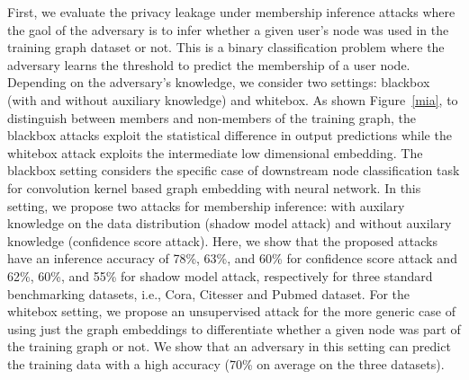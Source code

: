 First, we evaluate the privacy leakage under membership inference attacks where the gaol of the adversary is to infer whether a given user's node was used in the training graph dataset or not.
This is a binary classification problem where the adversary learns the threshold to predict the membership of a user node.
Depending on the adversary's knowledge, we consider two settings: blackbox (with and without auxiliary knowledge) and whitebox.
As shown Figure~\ref{mia}, to distinguish between members and non-members of the training graph, the blackbox attacks exploit the statistical difference in output predictions while the whitebox attack exploits the intermediate low dimensional embedding.
The blackbox setting considers the specific case of downstream node classification task for convolution kernel based graph embedding with neural network. %
In this setting, we propose two attacks for membership inference: with auxilary knowledge on the data distribution (shadow model attack) and without auxilary knowledge (confidence score attack).
Here, we show that the proposed attacks have an inference accuracy of 78\%, 63\%, and 60\% for confidence score attack and 62\%, 60\%, and 55\% for shadow model attack, respectively for three standard benchmarking datasets, i.e., Cora, Citesser and Pubmed dataset.
For the whitebox setting, we propose an unsupervised attack for the more generic case of using just the graph embeddings to differentiate whether a given node was part of the training graph or not.
We show that an adversary in this setting can predict the training data with a high accuracy (70\% on average on the three datasets).

